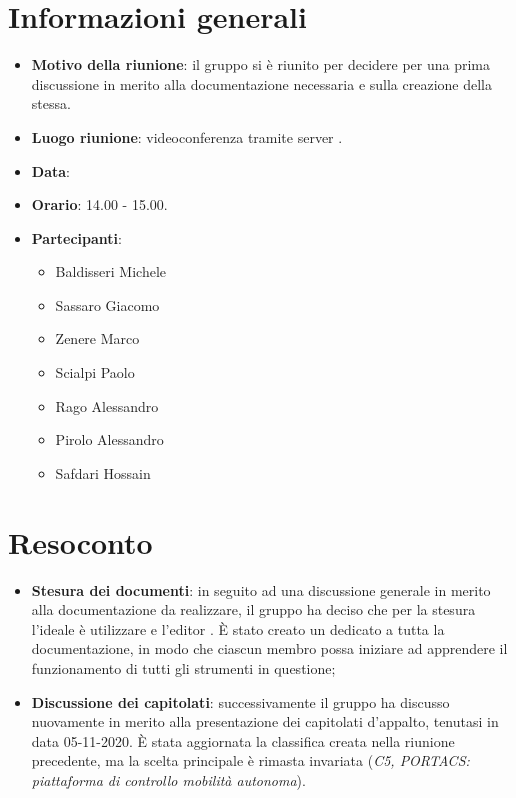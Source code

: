 \section{Informazioni generali}
\begin{itemize}
\item \textbf{Motivo della riunione}: il gruppo si è riunito per decidere per una prima discussione in merito alla documentazione necessaria e sulla creazione della stessa.
\item \textbf{Luogo riunione}: videoconferenza tramite server .
\item \textbf{Data}: \Data{}
\item \textbf{Orario}: 14.00 - 15.00.
\item \textbf{Partecipanti}:
	\begin{itemize}
	\item Baldisseri Michele
	\item Sassaro Giacomo
	\item Zenere Marco
	\item Scialpi Paolo
	\item Rago Alessandro
	\item Pirolo Alessandro
	\item Safdari Hossain
	\end{itemize}
\end{itemize}
\newpage
\section{Resoconto}
\begin{itemize}
\item \textbf{Stesura dei documenti}: in seguito ad una discussione generale in merito alla documentazione da realizzare, il gruppo ha deciso che per la stesura l'ideale è utilizzare  e l'editor . È stato creato un  dedicato a tutta la documentazione, in modo che ciascun membro possa iniziare ad apprendere il funzionamento di tutti gli strumenti in questione;

\item \textbf{Discussione dei capitolati}: successivamente il gruppo ha discusso nuovamente in merito alla presentazione dei capitolati d'appalto, tenutasi in data 05-11-2020. È stata aggiornata la classifica creata nella riunione precedente, ma la scelta principale è rimasta invariata (\textit{C5, PORTACS: piattaforma di controllo mobilità autonoma}).
\end{itemize}